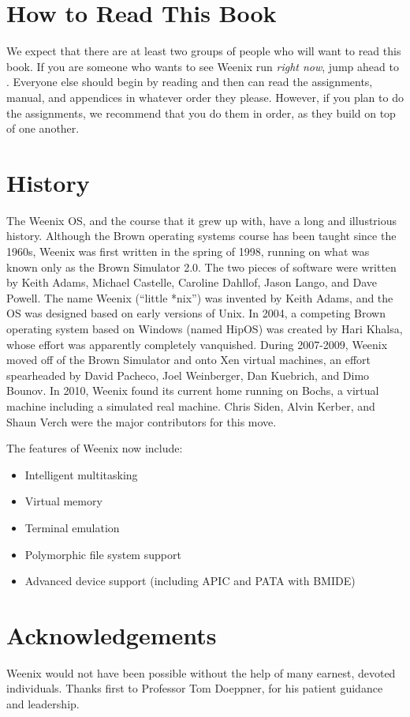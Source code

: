 \section{How to Read This Book}
We expect that there are at least two groups of people who will want to read this book. If you are someone who wants to see Weenix run \emph{right now}, jump ahead to . Everyone else should begin by reading  and then can read the assignments, manual, and appendices in whatever order they please. However, if you plan to do the assignments, we recommend that you do them in order, as they build on top of one another.

\section{History}
The Weenix OS, and the course that it grew up with, have a long and illustrious history. Although the Brown operating systems course has been taught since the 1960s, Weenix was first written in the spring of 1998, running on what was known only as the Brown Simulator 2.0. The two pieces of software were written by Keith Adams, Michael Castelle, Caroline Dahllof, Jason Lango, and Dave Powell. The name Weenix (``little *nix'') was invented by Keith Adams, and the OS was designed based on early versions of Unix. In 2004, a competing Brown operating system based on Windows (named HipOS) was created by Hari Khalsa, whose effort was apparently completely vanquished. During 2007-2009, Weenix moved off of the Brown Simulator and onto Xen virtual machines, an effort spearheaded by David Pacheco, Joel Weinberger, Dan Kuebrich, and Dimo Bounov. In 2010, Weenix found its current home running on Bochs, a virtual machine including a simulated real machine. Chris Siden, Alvin Kerber, and Shaun Verch were the major contributors for this move.

The features of Weenix now include:
\begin{itemize}
    \item Intelligent multitasking
    \item Virtual memory
    \item Terminal emulation
    \item Polymorphic file system support
    \item Advanced device support (including APIC and PATA with BMIDE)
\end{itemize}

\section{Acknowledgements}
Weenix would not have been possible without the help of many earnest, devoted individuals. Thanks first to Professor Tom Doeppner, for his patient guidance and leadership.

